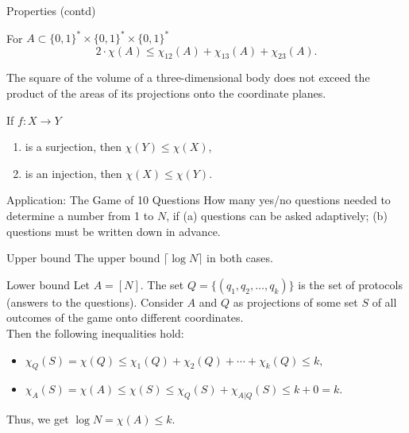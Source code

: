 \documentclass[handout,aspectratio=169]{beamer}
\newcommand{\bits}{\{0,1\}}
\newcommand{\bitstr}{\bits^*}
\newcommand{\seqn}[2]{{#1}_1,{#1}_2,\dotsc,{#1}_{#2}}
\begin{document}
\begin{frame}{Properties (contd)}
\begin{theorem}\label{thm:volume}
    For \(A\subset\bitstr\times\bitstr\times\bitstr\)
    \[2\cdot\chi(A) \le \chi_{12}(A) + \chi_{13}(A) + \chi_{23}(A).\]
\end{theorem}
\begin{corollary}
    The square of the volume of a three-dimensional body does not exceed the product of the areas of its projections onto the coordinate planes.
\end{corollary}

\begin{theorem}
    If \(f: X\to Y\)
    \begin{enumerate}
        \item is a surjection, then \(\chi(Y)\le \chi(X)\),
        \item is an injection, then \(\chi(X)\le \chi(Y)\).
    \end{enumerate}
\end{theorem}
\end{frame}

\begin{frame}{Application: The Game of 10 Questions}
    How many yes/no questions needed to determine a number from 1 to \(N\), if (a) questions can be asked adaptively; (b) questions must be written down in advance.

    \pause
    \begin{block}{Upper bound}
    The upper bound \(\lceil\log N\rceil\) in both cases.
    \end{block}
    \pause

    \begin{block}{Lower bound}
    Let \(A=[N]\). The set \(Q = \{(\seqn{q}{k})\}\) is the set of protocols (answers to the questions). Consider \(A\) and \(Q\) as projections of some set \(S\) of all outcomes of the game onto different coordinates. \\
    Then the following inequalities hold:
    \begin{itemize}
        \item \( \chi_Q(S) = \chi(Q) \le \chi_1(Q) + \chi_2(Q) + \dotsb + \chi_k(Q) \le k, \)
        \item \( \chi_A(S) = \chi(A) \le \chi(S) \le \chi_Q(S) + \chi_{A|Q}(S) \le k + 0 = k. \)
    \end{itemize}
    Thus, we get \(\log N = \chi(A) \le k\).
    \end{block}
\end{frame}
\end{document}
